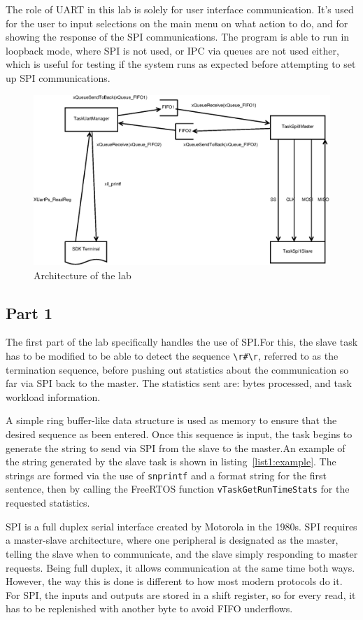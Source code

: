 \documentclass{article}
\begin{document}
The role of UART in this lab is solely for user interface communication. It's used for the user to input selections on the main menu on what action to do, and for showing the response of the SPI communications. The program is able to run in loopback mode, where SPI is not used, or IPC via queues are not used either, which is useful for testing if the system runs as expected before attempting to set up SPI communications.

\begin{figure}
    \includegraphics[width=\linewidth]{Diagram1.eps}
    \caption{Architecture of the lab}
    \label{fig1:arch}
\end{figure}

\subsection{Part 1}
The first part of the lab specifically handles the use of SPI.\@ For this, the slave task has to be modified to be able to detect the sequence \verb|\r#\r|, referred to as the termination sequence, before pushing out statistics about the communication so far via SPI back to the master. The statistics sent are: bytes processed, and task workload information.

A simple ring buffer-like data structure is used as memory to ensure that the desired sequence as been entered. Once this sequence is input, the task begins to generate the string to send via SPI from the slave to the master.\@ An example of the string generated by the slave task is shown in listing~\ref{list1:example}. The strings are formed via the use of \verb|snprintf| and a format string for the first sentence, then by calling the FreeRTOS function \verb|vTaskGetRunTimeStats| for the requested statistics.

SPI is a full duplex serial interface created by Motorola in the 1980s. SPI requires a master-slave architecture, where one peripheral is designated as the master, telling the slave when to communicate, and the slave simply responding to master requests. Being full duplex, it allows communication at the same time both ways. However, the way this is done is different to how most modern protocols do it. For SPI, the inputs and outputs are stored in a shift register, so for every read, it has to be replenished with another byte to avoid FIFO underflows.
\end{document}
